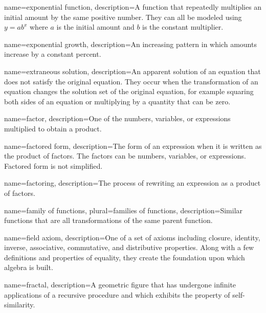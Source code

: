  {
	name=exponential function,
	description={A function that repeatedly multiplies an initial amount by the same positive number. They can all be modeled using $y = ab^x$ where $a$ is the initial amount and $b$ is the constant multiplier.}
}

 {
	name=exponential growth,
	description={An increasing pattern in which amounts increase by a constant percent.}
}

 {
	name=extraneous solution,
	description={An apparent solution of an equation that does not satisfy the original equation. They occur when the transformation of an equation changes the solution set of the original equation, for example squaring both sides of an equation or multiplying by a quantity that can be zero.}
}

 {
	name=factor,
	description={One of the numbers, variables, or expressions multiplied to obtain a product.}
}

 {
	name=factored form,
	description={The form of an expression when it is written as the product of factors. The factors can be numbers, variables, or expressions. Factored form is not simplified.}
}

 {
	name=factoring,
	description={The process of rewriting an expression as a product of factors.}
}

 {
	name=family of functions,
	plural=families of functions,
	description={Similar functions that are all transformations of the same parent function.}
}

 {
	name=field axiom,
	description={One of a set of axioms including closure, identity, inverse, associative, commutative, and distributive properties. Along with a few definitions and properties of equality, they create the foundation upon which algebra is built.}
}


 {
	name=fractal,
	description={A geometric figure that has undergone infinite applications of a recursive procedure and which exhibits the property of self-similarity. }
}

